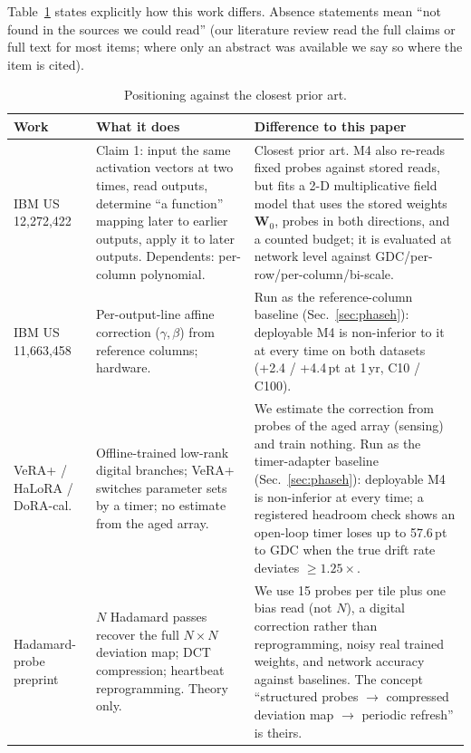\documentclass[journal]{IEEEtran}
\newcommand{\mfour}{\textsc{M4}}
\newcommand{\pt}{\,pt}
\newcommand{\W}{\mathbf{W}}
\begin{document}
Table~\ref{tab:position} states explicitly how this work differs. Absence statements mean ``not found in the sources we
could read'' (our literature review read the full claims or full text for most items; where only an abstract was available we say so where the item is cited).

\begin{table}[t]
\caption{Positioning against the closest prior art.}
\label{tab:position}
\centering\footnotesize
\begin{tabular}{p{2.6cm}p{5.3cm}p{8.6cm}}
\toprule
Work & What it does & Difference to this paper \\
\midrule
IBM US 12,272,422 \cite{ibm12272422} & Claim 1: input the same activation vectors at two times, read outputs, determine ``a function'' mapping later to earlier outputs, apply it to later outputs. Dependents: per-column polynomial. &
Closest prior art. \mfour{} also re-reads fixed probes against stored reads, but fits a 2-D multiplicative field model that uses the stored weights $\W_0$, probes in both directions, and a counted budget; it is evaluated at network level against GDC/per-row/per-column/bi-scale. \\
IBM US 11,663,458 \cite{ibm11663458} & Per-output-line affine correction ($\gamma,\beta$) from reference columns; hardware. & Run as the reference-column baseline (Sec.~\ref{sec:phaseh}): deployable \mfour{} is non-inferior to it at every time on both datasets (+2.4 / +4.4\pt{} at 1\,yr, C10 / C100). \\
VeRA+ / HaLoRA / DoRA-cal.\ \cite{vera2026,halora2025,doracal2025} & Offline-trained low-rank digital branches; VeRA+ switches parameter sets by a timer; no estimate from the aged array. &
We estimate the correction from probes of the aged array (sensing) and train nothing. Run as the timer-adapter baseline (Sec.~\ref{sec:phaseh}): deployable \mfour{} is non-inferior at every time; a registered headroom check shows an open-loop timer loses up to 57.6\pt{} to GDC when the true drift rate deviates $\ge1.25\times$. \\
Hadamard-probe preprint \cite{boggaram} & $N$ Hadamard passes recover the full $N{\times}N$ deviation map; DCT compression; heartbeat reprogramming. Theory only. &
We use 15 probes per tile plus one bias read (not $N$), a digital correction rather than reprogramming, noisy real trained weights, and network accuracy against baselines. The concept ``structured probes $\to$ compressed deviation map $\to$ periodic refresh'' is theirs. \\

\end{tabular}
\end{table}
\end{document}
